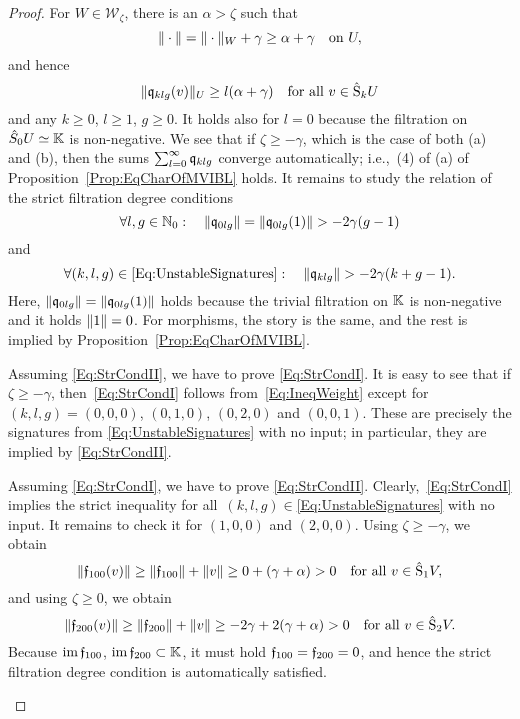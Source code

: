 \documentclass[\MainFolder/Text.tex]{subfiles}
\begin{document}
\begin{proof}
For $W\in \mathcal{W}_\zeta$, there is an $\alpha>\zeta$ such that
$$ \| \cdot \| = \| \cdot \|_W + \gamma \ge  \alpha + \gamma \quad\text{on }U, $$
and hence
\begin{equation}\label{Eq:IneqWeight}
\| \mathfrak{q}_{klg}(v) \|_U \ge l (\alpha + \gamma) \quad\text{for all }v\in\hat{\mathrm{S}}_k U
\end{equation}
and any $k\ge 0$, $l\ge 1$, $g\ge 0$. It holds also for $l=0$ because the filtration on $\hat{S}_0 U \simeq \mathbb{K}$ is non-negative. We see that if $\zeta\ge -\gamma$, which is the case of both (a) and (b), then the sums $\sum_{l=0}^\infty \mathfrak{q}_{klg}$ converge automatically; i.e.,~(4) of (a) of Proposition~\ref{Prop:EqCharOfMVIBL} holds. It remains to study the relation of the strict filtration degree conditions
\begin{equation}\label{Eq:StrCondI}
\forall l, g\in \mathbb{N}_0:\quad  \| \mathfrak{q}_{0lg} \| = \| \mathfrak{q}_{0lg}(1) \|  > - 2\gamma(g-1)
\end{equation}
and
\begin{equation}\label{Eq:StrCondII}
\forall (k,l,g)\in \eqref{Eq:UnstableSignatures}:\quad\| \mathfrak{q}_{klg} \| > -2\gamma(k+g-1).
\end{equation}
Here, $\| \mathfrak{q}_{0lg} \| = \| \mathfrak{q}_{0lg}(1) \|$ holds because the trivial filtration on $\mathbb{K}$ is non-negative and it holds $\| 1 \| = 0$. For morphisms, the story is the same, and the rest is implied by Proposition~\ref{Prop:EqCharOfMVIBL}. 
\begin{ProofList}
\item Assuming \eqref{Eq:StrCondII}, we have to prove \eqref{Eq:StrCondI}. It is easy to see that if $\zeta \ge -\gamma$, then~\eqref{Eq:StrCondI} follows from~\eqref{Eq:IneqWeight} except for $(k,l,g) = (0,0,0)$, $(0,1,0)$, $(0,2,0)$ and $(0,0,1)$. These are precisely the signatures from \eqref{Eq:UnstableSignatures} with no input; in particular, they are implied by \eqref{Eq:StrCondII}.
\item Assuming \eqref{Eq:StrCondI}, we have to prove \eqref{Eq:StrCondII}. Clearly,~\eqref{Eq:StrCondI} implies the strict inequality for all~$(k,l,g)\in$\eqref{Eq:UnstableSignatures} with no input. It remains to check it for $(1,0,0)$ and $(2,0,0)$. Using $\zeta\ge-\gamma$, we obtain
$$ \| \mathfrak{f}_{100}(v) \| \ge \| \mathfrak{f}_{100} \| + \| v \| \ge 0 + (\gamma + \alpha) > 0\quad\text{for all }v\in\hat{\mathrm{S}}_1 V, $$ 
and using $\zeta \ge 0$, we obtain
$$ \| \mathfrak{f}_{200}(v) \| \ge \| \mathfrak{f}_{200} \| + \| v \| \ge - 2 \gamma + 2(\gamma + \alpha)>0\quad\text{for all }v\in\hat{\mathrm{S}}_2 V. $$
Because $\operatorname{im} \mathfrak{f}_{100}$, $\operatorname{im} \mathfrak{f}_{200} \subset \mathbb{K}$, it must hold $\mathfrak{f}_{100} = \mathfrak{f}_{200} = 0$, and hence the strict filtration degree condition is automatically satisfied.


\end{ProofList}
\end{proof}
\end{document}
